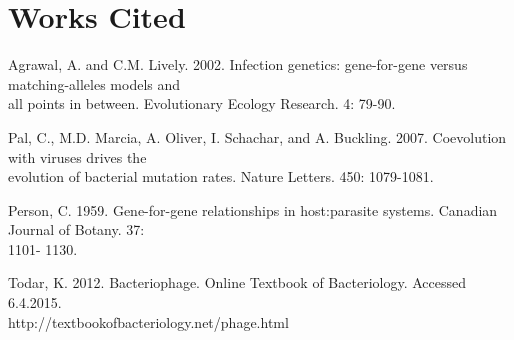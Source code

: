 \documentclass[11pt, oneside]{article}
\begin{document}
\section{Works Cited}
Agrawal, A. and C.M. Lively. 2002. Infection genetics: gene-for-gene versus matching-alleles models and \\\-\hspace{0.75cm} all points in between. Evolutionary Ecology Research. 4: 79-90.

Pal, C., M.D. Marcia, A. Oliver, I. Schachar, and A. Buckling. 2007. Coevolution with viruses drives the \\\-\hspace{0.75cm} evolution of bacterial mutation rates. Nature Letters. 450: 1079-1081.

Person, C. 1959. Gene-for-gene relationships in host:parasite systems. Canadian Journal of Botany. 37: \\\-\hspace{0.75cm} 1101- 1130.

Todar, K. 2012. Bacteriophage. Online Textbook of Bacteriology. Accessed 6.4.2015.\\\-\hspace{0.75cm} http://textbookofbacteriology.net/phage.html
\end{document}
